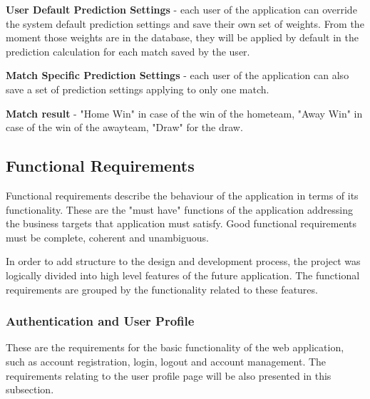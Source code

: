 \textbf{User Default Prediction Settings} - each user of the application can override the system default prediction settings and save their own set of weights. From the moment those weights are in the database, they will be applied by default in the prediction calculation for each match saved by the user. 

\textbf{Match Specific Prediction Settings} - each user of the application can also save a set of prediction settings applying to only one match. 

\textbf{Match result} - "Home Win" in case of the win of the hometeam, "Away Win" in case of the win of the awayteam, "Draw" for the draw.

\subsection{Functional Requirements}
\label{sec:functionalrequirements_req}
Functional requirements describe the behaviour of the application in terms of its functionality. These are the "must have" functions of the application addressing the business targets that application must satisfy. Good functional requirements must be complete, coherent and unambiguous.
 
In order to add structure to the design and development process, the project was logically divided into high level features of the future application. The functional requirements are grouped by the functionality related to these features.

\subsubsection{Authentication and User Profile}
\label{sec:authandprofile_req}
These are the requirements for the basic functionality of the web application, such as account registration, login, logout and account management. The requirements relating to the user profile page will be also presented in this subsection.

